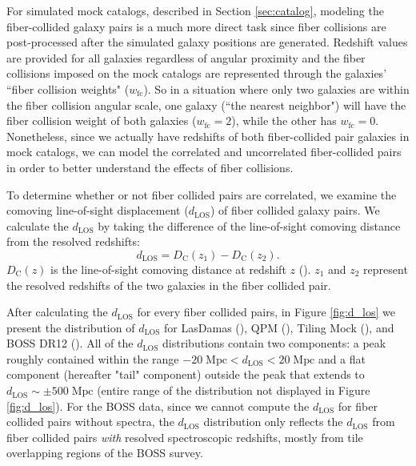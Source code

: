 \documentclass{emulateapj}
\begin{document}
For simulated mock catalogs, described in Section \ref{sec:catalog}, modeling the fiber-collided galaxy pairs is a much more direct task since fiber collisions are post-processed after the simulated galaxy positions are generated. Redshift values are provided for all galaxies regardless of angular proximity and the fiber collisions imposed on the mock catalogs are represented through the galaxies' ``fiber collision weights" ($w_\mathrm{fc}$). So in a situation where only two galaxies are within the fiber collision angular scale, one galaxy (``the nearest neighbor") will have the fiber collision weight of both galaxies ($w_{\mathrm{fc}} = 2$), while the other has $w_\mathrm{fc} = 0$. Nonetheless, since we actually have redshifts of both fiber-collided pair galaxies in mock catalogs, we can model the correlated and uncorrelated fiber-collided pairs in order to better understand the effects of fiber collisions. 

To determine whether or not fiber collided pairs are correlated, we examine the comoving line-of-sight displacement ($d_{\mathrm{LOS}}$) of fiber collided galaxy pairs. We calculate the $d_{\mathrm{LOS}}$ by taking the difference of the line-of-sight comoving distance from the resolved redshifts: 
\begin{equation}
d_{\mathrm{LOS}} = D_{\mathrm{C}} (z_1) - D_{\mathrm{C}} (z_2). 
\end{equation}
$D_{\mathrm{C}}(z)$ is the line-of-sight comoving distance at redshift $z$ (\citealt{Hogg:1999aa}). $z_1$ and $z_2$ represent the resolved redshifts of the two galaxies in the fiber collided pair.

After calculating the $d_{\mathrm{LOS}}$ for every fiber collided pairs, in Figure \ref{fig:d_los} we present the distribution of $d_{\mathrm{LOS}}$ for LasDamas (\ldgcolor), QPM (\qpmcolor), Tiling Mock (\tmcolor), and BOSS DR12 (\cmasscolor). All of the $d_{\mathrm{LOS}}$ distributions contain two components: a peak roughly contained within the range $-20\;\mathrm{Mpc} < d_{\mathrm{LOS}} < 20\;\mathrm{Mpc}$ and a flat component (hereafter "tail" component) outside the peak that extends to $d_{\mathrm{LOS}} \sim \pm 500 \;\mathrm{Mpc}$ (entire range of the distribution not displayed in Figure \ref{fig:d_los}). For the BOSS data, since we cannot compute the $d_\mathrm{LOS}$ for fiber collided pairs without spectra, the $d_\mathrm{LOS}$ distribution only reflects the $d_\mathrm{LOS}$ from fiber collided pairs {\em with} resolved spectroscopic redshifts, mostly from tile overlapping regions of the BOSS survey.
\end{document}

